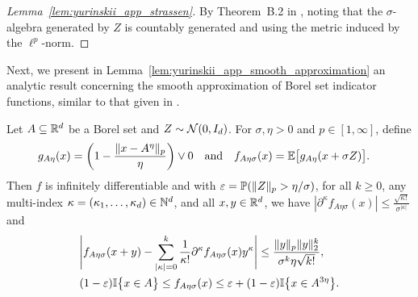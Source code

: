 \begin{proof}[Lemma~\ref{lem:yurinskii_app_strassen}]
  By Theorem~B.2 in \citet{chen2020jackknife}, noting that the $\sigma$-algebra
  generated by $Z$ is countably generated and using the metric induced by the
  $\ell^p$-norm.
\end{proof}

Next, we present in Lemma~\ref{lem:yurinskii_app_smooth_approximation} an
analytic result
concerning the smooth approximation of Borel set indicator functions, similar
to that given in \citet[Lemma~39]{belloni2019conditional}.

\begin{lemma}%
  \label{lem:yurinskii_app_smooth_approximation}
  Let $A \subseteq \R^d$ be a Borel set and $Z \sim \cN(0, I_d)$.
  For $\sigma, \eta > 0$ and $p \in [1, \infty]$, define
  \begin{align*}
    g_{A\eta}(x)
    &=
    \left( 1 - \frac{\|x-A^\eta\|_p}{\eta} \right) \vee 0
    & &\text{and}
    &f_{A\eta\sigma}(x)
    &=
    \E\big[g_{A\eta}(x + \sigma Z) \big].
  \end{align*}
  Then $f$ is infinitely differentiable
  and with $\varepsilon = \P(\|Z\|_p > \eta / \sigma)$,
  for all $k \geq 0$,
  any multi-index $\kappa = (\kappa_1,\dots, \kappa_d)\in\N^d$,
  and all $x,y \in \R^d$,
  we have $|\partial^\kappa f_{A\eta\sigma}(x)| \leq
  \frac{\sqrt{\kappa!}}{\sigma^{|\kappa|}}$ and
  \begin{align*}
    &\Bigg|
    f_{A\eta\sigma}(x+y) - \sum_{|\kappa| = 0}^k
    \frac{1}{\kappa!}
    \partial^\kappa f_{A\eta\sigma}(x)
    y^\kappa
    \Bigg|
    \leq
    \frac{\|y\|_p \|y\|_2^k}{\sigma^k \eta \sqrt{k!}}, \\
    &(1 - \varepsilon) \I\big\{x \in A\big\}
    \leq f_{A\eta\sigma}(x)
    \leq \varepsilon + (1 - \varepsilon)
    \I\big\{x \in A^{3\eta}\big\}.
  \end{align*}
\end{lemma}

